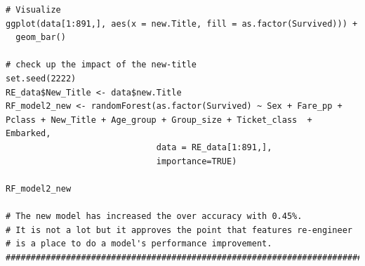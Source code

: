 \documentclass[
]{book}
\begin{document}
\begin{verbatim}
# Visualize
ggplot(data[1:891,], aes(x = new.Title, fill = as.factor(Survived))) +
  geom_bar()

# check up the impact of the new-title
set.seed(2222)
RE_data$New_Title <- data$new.Title
RF_model2_new <- randomForest(as.factor(Survived) ~ Sex + Fare_pp + Pclass + New_Title + Age_group + Group_size + Ticket_class  + Embarked,
                              data = RE_data[1:891,],
                              importance=TRUE)

RF_model2_new

# The new model has increased the over accuracy with 0.45%.
# It is not a lot but it approves the point that features re-engineer
# is a place to do a model's performance improvement.
###########################################################################
\end{verbatim}

  

\printindex
\end{document}
